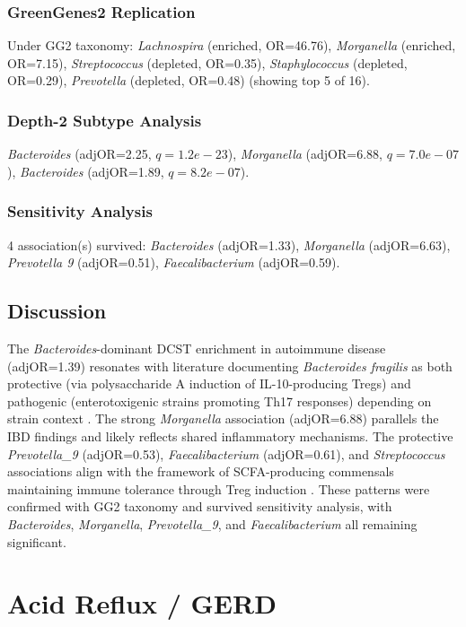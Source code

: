 \documentclass[11pt,a4paper]{article}
\begin{document}
\subsubsection{GreenGenes2 Replication}
Under GG2 taxonomy: \textit{Lachnospira} (enriched, OR=46.76), \textit{Morganella} (enriched, OR=7.15), \textit{Streptococcus} (depleted, OR=0.35), \textit{Staphylococcus} (depleted, OR=0.29), \textit{Prevotella} (depleted, OR=0.48) (showing top 5 of 16).

\subsubsection{Depth-2 Subtype Analysis}
\textit{Bacteroides} (adjOR=2.25, $q=1.2e-23$), \textit{Morganella} (adjOR=6.88, $q=7.0e-07$), \textit{Bacteroides} (adjOR=1.89, $q=8.2e-07$).

\subsubsection{Sensitivity Analysis}
4 association(s) survived: \textit{Bacteroides} (adjOR=1.33), \textit{Morganella} (adjOR=6.63), \textit{Prevotella 9} (adjOR=0.51), \textit{Faecalibacterium} (adjOR=0.59).

\subsection{Discussion}
The \textit{Bacteroides}-dominant DCST enrichment in autoimmune disease (adjOR=1.39) resonates with literature documenting \textit{Bacteroides fragilis} as both protective (via polysaccharide A induction of IL-10-producing Tregs) and pathogenic (enterotoxigenic strains promoting Th17 responses) depending on strain context \cite{DeLuca2019_autoimmune}. The strong \textit{Morganella} association (adjOR=6.88) parallels the IBD findings and likely reflects shared inflammatory mechanisms. The protective \textit{Prevotella\_9} (adjOR=0.53), \textit{Faecalibacterium} (adjOR=0.61), and \textit{Streptococcus} associations align with the framework of SCFA-producing commensals maintaining immune tolerance through Treg induction \cite{Atarashi2013_Clostridia_Treg}. These patterns were confirmed with GG2 taxonomy and survived sensitivity analysis, with \textit{Bacteroides}, \textit{Morganella}, \textit{Prevotella\_9}, and \textit{Faecalibacterium} all remaining significant.
\newpage

\section{Acid Reflux / GERD}
\end{document}

